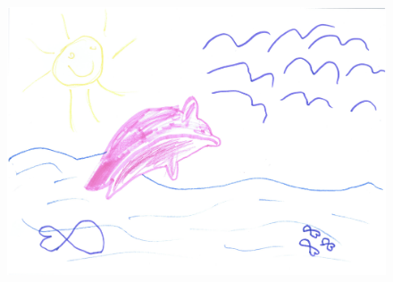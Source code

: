 \medskip
\begin{figure}[H]
\centering
\includegraphics[width=\textwidth]{bilder/oma1.pdf}
\end{figure}
\medskip
